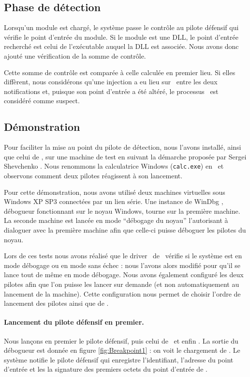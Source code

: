 \subsection{Phase de détection}
Lorsqu'un module est chargé, le système passe le contrôle au pilote défensif qui vérifie le point d'entrée du module.
Si le module est une DLL, le point d'entrée recherché est celui de l'exécutable auquel la DLL est associée.
Nous avons donc ajouté une vérification de la somme de contrôle.

Cette somme de contrôle est comparée à celle calculée en premier lieu.
Si elles diffèrent, nous considérons qu'une injection a eu lieu sur \services\ entre les deux notifications et, puisque son point d'entrée a été altéré, le processus \services\ est considéré comme suspect.


\subsection{Démonstration}
Pour faciliter la mise au point du pilote de détection, nous l'avons installé, ainsi que celui de \duqu, sur une machine de test en suivant la démarche proposée par Sergei Shevchenko \cite{SShevchenko}.
Nous renommons la calculatrice Windows (\texttt{calc.exe}) en \services\ et observons comment deux pilotes réagissent à son lancement.

Pour cette démonstration, nous avons utilisé deux machines virtuelles sous Windows XP SP3 connectées par un lien série.
Une instance de WinDbg \cite{WinDBG}, débogueur fonctionnant sur le noyau Windows, tourne sur la première machine.
La seconde machine est lancée en mode ``débogage du noyau'' l'autorisant à dialoguer avec la première machine afin que celle-ci puisse déboguer les pilotes du noyau.

Lors de ces tests nous avons réalisé que le driver \driver\ de \duqu\ vérifie si le système est en mode débogage ou en mode sans échec : nous l'avons alors modifié pour qu'il se lance tout de même en mode débogage.
Nous avons également configuré les deux pilotes afin que l'on puisse les lancer sur demande (et non automatiquement au lancement de la machine).
Cette configuration nous permet de choisir l'ordre de lancement des pilotes ainsi que de \services.

\paragraph{Lancement du pilote défensif en premier.}
Nous lançons en premier le pilote défensif, puis celui de \duqu\ et enfin \services.
La sortie du débogueur est donnée en figure \ref{fig:Breakpoint1} : on voit le chargement de \services.
Le système notifie le pilote défensif qui enregistre l'identifiant, l'adresse du point d'entrée et les la signature des premiers octets du point d'entrée de \services.

